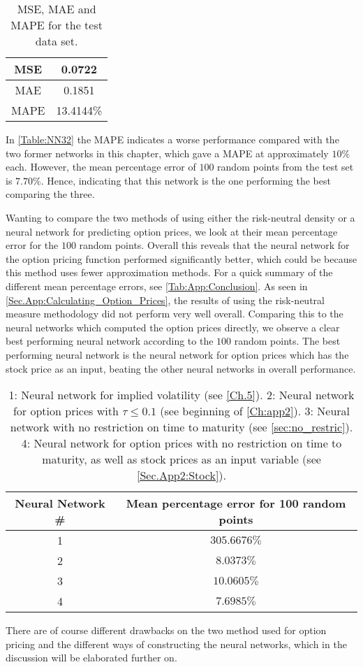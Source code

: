 \begin{table}[H]
    \centering
    {\renewcommand{\arraystretch}{1.25}\begin{tabular}{c|c}
        MSE  &  0.0722\\ \hline
        MAE  &  0.1851\\ \hline
        MAPE &  13.4144\%\\ 
    \end{tabular}}
    \caption{MSE, MAE and MAPE for the test data set.}
    \label{Table:NN32}
\end{table}

In \autoref{Table:NN32} the MAPE indicates a worse performance compared with the two former networks in this chapter, which gave a MAPE at approximately $10\%$ each. However, the mean percentage error of $100$ random points from the test set is $7.70\%$. Hence, indicating that this network is the one performing the best comparing the three. 

Wanting to compare the two methods of using either the risk-neutral density or a neural network for predicting option prices, we look at their mean percentage error for the $100$ random points. Overall this reveals that the neural network for the option pricing function performed significantly better, which could be because this method uses fewer approximation methods. For a quick summary of the different mean percentage errors, see \autoref{Tab:App:Conclusion}. As seen in \autoref{Sec.App:Calculating_Option_Prices}, the results of using the risk-neutral measure methodology did not perform very well overall. Comparing this to the neural networks which computed the option prices directly, we observe a clear best performing neural network according to the $100$ random points. The best performing neural network is the neural network for option prices which has the stock price as an input, beating the other neural networks in overall performance. 

\begin{table}[H]
    \centering
    \begin{tabular}{c|c}
        Neural Network \# & Mean percentage error for 100 random points \\ \hline
        1 &  $305.6676\%$ \\\hline
        2 &  $8.0373\%$ \\\hline
        3 & $10.0605\%$  \\\hline
        4 & $7.6985\%$ 
    \end{tabular}
    \caption{1: Neural network for implied volatility (see \autoref{Ch.5}). 2: Neural network for option prices with $\tau\leq0.1$ (see beginning of \autoref{Ch:app2}). 3: Neural network with no restriction on time to maturity (see \autoref{sec:no_restric}). 4: Neural network for option prices with no restriction on time to maturity, as well as stock prices as an input variable (see \autoref{Sec.App2:Stock}).}
    \label{Tab:App:Conclusion}
\end{table}

There are of course different drawbacks on the two method used for option pricing and the different ways of constructing the neural networks, which in the discussion will be elaborated further on. 


